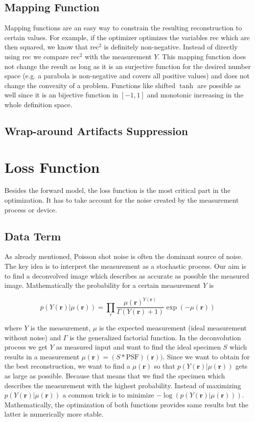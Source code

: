 \documentclass{juliacon}
\begin{document}
\subsection{Mapping Function}
    Mapping functions are an easy way to constrain the resulting reconstruction to certain values.
    For example, if the optimizer optimizes the variables $\text{rec}$ which are then squared, we know that
    $\text{rec}^2$ is definitely non-negative. Instead of directly using $\text{rec}$ we compare
    $\text{rec}^2$ with the measurement $Y$. This mapping function does not change the result as long
    as it is an surjective function for the desired number space (e.g. a parabola is non-negative and covers all positive values) 
    and does not change the convexity of a problem.
    Functions like shifted $\tanh$ are possible as well since it is an bijective function in $[-1, 1]$ and monotonic increasing
    in the whole definition space.



\subsection{Wrap-around Artifacts Suppression}

\section{Loss Function}
    Besides the forward model, the loss function is the most critical part in the optimization.
    It has to take account for the noise created by the measurement process or device. 

\subsection{Data Term}
    As already mentioned, Poisson shot noise is often the dominant source of noise.
    The key idea is to interpret the measurement as a stochastic process. Our aim is to find a deconvolved image which describes as accurate as possible the measured image.
Mathematically the probability for a certain measurement $Y$ is

\begin{equation}
    p(Y(\mathbf r)|\mu(\mathbf r)) = \prod_r \frac{\mu(\mathbf r)^{Y(\mathbf r)}}{\Gamma(Y(\mathbf r) + 1)} \exp(- \mu(\mathbf r))
\end{equation}

where $Y$ is the measurement, $\mu$ is the expected measurement (ideal measurement without noise) and $\Gamma$ is the generalized factorial function.
In the deconvolution process we get $Y$ as measured input and want to find the ideal specimen $S$ which results in a measurement $\mu(\mathbf r) = (S * \text{PSF})(\mathbf r))$.
Since we want to obtain for the best reconstruction, we want to find a $\mu(\mathbf r)$ so that $p(Y(\mathbf r) | \mu(\mathbf r))$ gets as large as possible. Because that means
that we find the specimen which describes the measurement with the highest probability.
Instead of maximizing $p(Y(\mathbf r) | \mu(\mathbf r))$ a common trick is to minimize $- \log(p(Y(\mathbf r)|\mu(\mathbf r)))$. 
Mathematically, the optimization of both functions provides same results but the latter is numerically more stable.
\end{document}
